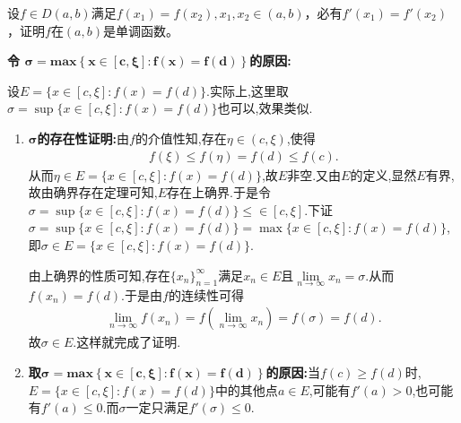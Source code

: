 \documentclass[../../main.tex]{subfiles}%
\begin{document}
\begin{proposition}[函数值相同的点导数值相同就一定单调]\label{proposition:函数值相同的点导数值相同就一定单调}
设\(f\in D(a,b)\)满足\(f(x_1)=f(x_2),x_1,x_2\in(a,b)\)，必有\(f'(x_1)=f'(x_2)\)，证明\(f\)在\((a,b)\)是单调函数。
\end{proposition}
\begin{note}
\hypertarget{令
sigma=max{x in[c,xi]:f(x)=f(d)}的原因
}{\textbf{令
\(
\boldsymbol{\sigma }=\mathbf{max}\left\{ \boldsymbol{x}\in \left[ \boldsymbol{c},\boldsymbol{\xi } \right] :\boldsymbol{f}\left( \boldsymbol{x} \right) =\boldsymbol{f}\left( \boldsymbol{d} \right) \right\}    
\)的原因:}}设$E=\{x\in[c,\xi]:f(x)=f(d)\}$.实际上,这里取$\sigma=\sup\{x\in[c,\xi]:f(x)=f(d)\}$也可以,效果类似.
\begin{enumerate}[(1)]
\item \textbf{$\boldsymbol{\sigma }$的存在性证明:}由$f$的介值性知,存在$\eta\in (c,\xi)$,使得
\begin{align*}
f(\xi)\leqslant  f(\eta)=f(d)\leqslant  f(c).
\end{align*}
从而$\eta \in E=\{x\in[c,\xi]:f(x)=f(d)\}$,故$E$非空.又由$E$的定义,显然$E$有界,故由确界存在定理可知,$E$存在上确界.于是令$\sigma=\sup\{x\in[c,\xi]:f(x)=f(d)\}\leqslant  \in[c,\xi]$.下证$\sigma=\sup\{x\in[c,\xi]:f(x)=f(d)\}=\max\{x\in[c,\xi]:f(x)=f(d)\}$,即$\sigma\in E=\{x\in[c,\xi]:f(x)=f(d)\}$.

由上确界的性质可知,存在$\{x_n\}_{n=1}^\infty$满足$x_n \in E$且$\underset{n\rightarrow \infty}{\lim}x_n=\sigma $.从而$f(x_n)=f(d)$.于是由$f$的连续性可得
\begin{align*}
\underset{n\rightarrow \infty}{\lim}f\left( x_n \right) =f\left( \underset{n\rightarrow \infty}{\lim}x_n \right) =f\left( \sigma \right) =f\left( d \right) .
\end{align*}
故$\sigma \in E$.这样就完成了证明.

\item \textbf{取$\boldsymbol{\sigma }=\mathbf{max}\left\{ \boldsymbol{x}\in \left[ \boldsymbol{c},\boldsymbol{\xi } \right] :\boldsymbol{f}\left( \boldsymbol{x} \right) =\boldsymbol{f}\left( \boldsymbol{d} \right) \right\} $的原因:}当\(f(c)\geqslant f(d)\)时,$E=\{x\in[c,\xi]:f(x)=f(d)\}$中的其他点$a\in E$,可能有$f'\left( a \right) >0$,也可能有$f'\left( a \right) \leqslant 0$.而$\sigma$一定只满足$f'\left( \sigma \right) \leqslant 0$.
\end{enumerate}
\end{note}
\end{document}
